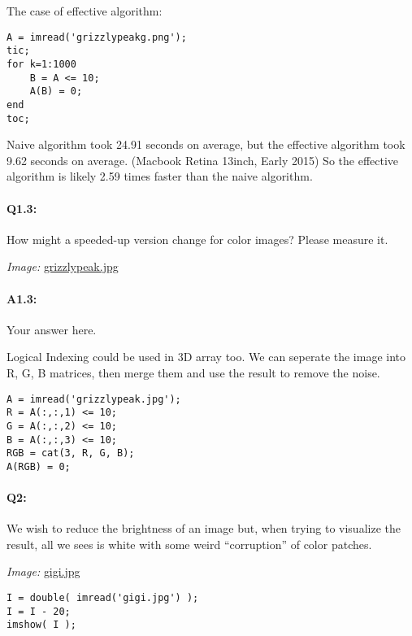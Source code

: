 \documentclass[11pt]{article}
\begin{document}
The case of effective algorithm:
\begin{lstlisting}[style=Matlab-editor]
A = imread('grizzlypeakg.png');
tic;
for k=1:1000
    B = A <= 10;
    A(B) = 0;
end
toc;
\end{lstlisting}

Naive algorithm took 24.91 seconds on average, but the effective algorithm took 9.62 seconds on average. (Macbook Retina 13inch, Early 2015)
So the effective algorithm is likely 2.59 times faster than the naive algorithm.


\pagebreak
\paragraph{Q1.3:} How might a speeded-up version change for color images? Please measure it.

\emph{Image:} \href{grizzlypeak.jpg}{grizzlypeak.jpg}

\paragraph{A1.3:} Your answer here.

Logical Indexing could be used in 3D array too. We can seperate the image into R, G, B matrices, then merge them and use the result to remove the noise.

\begin{lstlisting}[style=Matlab-editor]
A = imread('grizzlypeak.jpg');
R = A(:,:,1) <= 10;
G = A(:,:,2) <= 10;
B = A(:,:,3) <= 10;
RGB = cat(3, R, G, B);
A(RGB) = 0;
\end{lstlisting}



\pagebreak
\paragraph{Q2:} We wish to reduce the brightness of an image but, when trying to visualize the result, all we sees is white with some weird ``corruption'' of color patches.

\emph{Image:} \href{gigi.jpg}{gigi.jpg}

\begin{lstlisting}[style=Matlab-editor]
I = double( imread('gigi.jpg') );
I = I - 20;
imshow( I );
\end{lstlisting}
\end{document}
